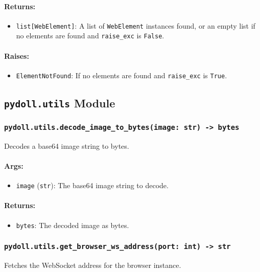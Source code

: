 \documentclass{article}
\begin{document}
\paragraph{Returns:}
\begin{itemize}
    \item \texttt{list[WebElement]}: A list of \texttt{WebElement} instances found, or an empty list if no elements are found and \texttt{raise\_exc} is \texttt{False}.
\end{itemize}

\paragraph{Raises:}
\begin{itemize}
    \item \texttt{ElementNotFound}: If no elements are found and \texttt{raise\_exc} is \texttt{True}.
\end{itemize}

\hrulefill

\subsection*{\texttt{pydoll.utils} Module}

\subsubsection*{\texttt{pydoll.utils.decode\_image\_to\_bytes(image: str) -> bytes}}
\noindent Decodes a base64 image string to bytes.

\paragraph{Args:}
\begin{itemize}
    \item \texttt{image} (\texttt{str}): The base64 image string to decode.
\end{itemize}

\paragraph{Returns:}
\begin{itemize}
    \item \texttt{bytes}: The decoded image as bytes.
\end{itemize}

\subsubsection*{\texttt{pydoll.utils.get\_browser\_ws\_address(port: int) -> str}}
\noindent Fetches the WebSocket address for the browser instance.
\end{document}
